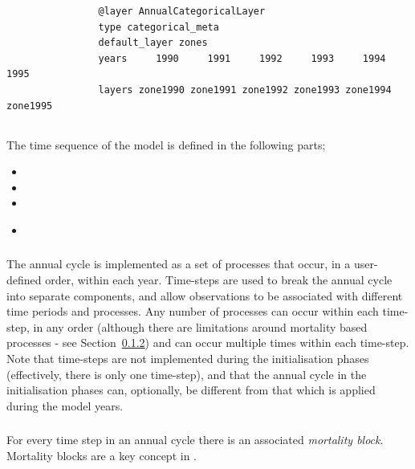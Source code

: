\begin{enumerate}
\begin{enumerate}
		{\small{\begin{verbatim}
				@layer AnnualCategoricalLayer
				type categorical_meta
				default_layer zones
				years     1990     1991     1992     1993     1994     1995
				layers zone1990 zone1991 zone1992 zone1993 zone1994 zone1995
				\end{verbatim}}}
	\end{enumerate}
\end{enumerate}




\subsection{}

The time sequence of the model is defined in the following parts;
\begin{itemize}
  \item {}
  \item {}
  \item {}
  \item {}\textsl{}
\end{itemize}

\subsubsection{}
The annual cycle is implemented as a set of processes that occur, in a user-defined order, within each year. Time-steps are used to break the annual cycle into separate components, and allow observations to be associated with different time periods and processes. Any number of processes can occur within each time-step, in any order (although there are limitations around mortality based processes - see Section~\ref{sec:mortality_block}) and can occur multiple times within each time-step. Note that time-steps are not implemented during the initialisation phases (effectively, there is only one time-step), and that the annual cycle in the initialisation phases can, optionally, be different from that which is applied during the model years.

\subsubsection{}\label{sec:mortality_block}

For every time step in an annual cycle there is an associated \emph{mortality block}. Mortality blocks are a key concept in \IBM.

